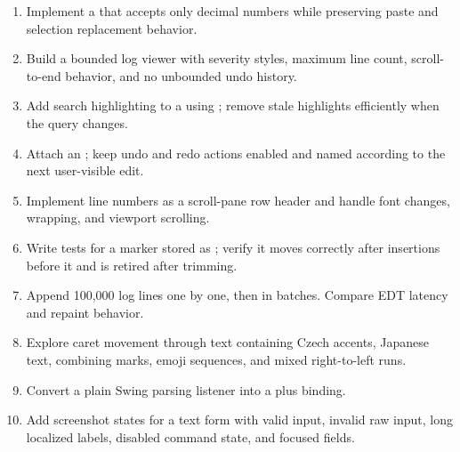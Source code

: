 \begin{exercisebox}
\begin{enumerate}
\item Implement a  that accepts only decimal numbers while preserving paste and selection replacement behavior.
\item Build a bounded log viewer with severity styles, maximum line count, scroll-to-end behavior, and no unbounded undo history.
\item Add search highlighting to a  using ; remove stale highlights efficiently when the query changes.
\item Attach an ; keep undo and redo actions enabled and named according to the next user-visible edit.
\item Implement line numbers as a scroll-pane row header and handle font changes, wrapping, and viewport scrolling.
\item Write tests for a marker stored as ; verify it moves correctly after insertions before it and is retired after trimming.
\item Append 100,000 log lines one by one, then in batches. Compare EDT latency and repaint behavior.
\item Explore caret movement through text containing Czech accents, Japanese text, combining marks, emoji sequences, and mixed right-to-left runs.
\item Convert a plain Swing parsing listener into a  plus  binding.
\item Add screenshot states for a text form with valid input, invalid raw input, long localized labels, disabled command state, and focused fields.
\end{enumerate}
\end{exercisebox}

